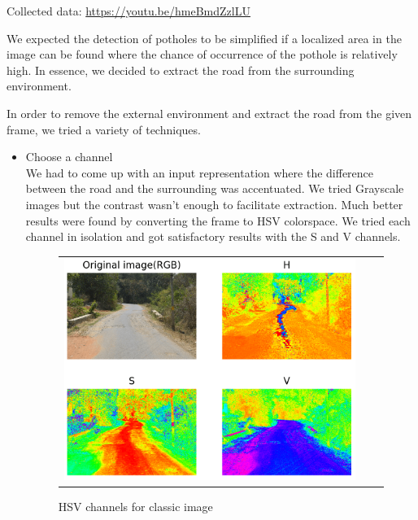 \documentclass[12pt,a4paper]{article}
\begin{document}
\vspace*{.25cm}

Collected data: \url{ https://youtu.be/hmeBmdZzlLU }

\vspace*{.25cm}

We expected the detection of potholes to be simplified if a localized area in the image can be found where the chance of occurrence of the pothole is relatively high. In essence, we decided to extract the road from the surrounding environment.

In order to remove the external environment and extract the road from the given frame, we tried a variety of techniques. 

\begin{itemize}

\item Choose a channel \\
    We had to come up with an input representation where the difference between the road and the surrounding was accentuated. We tried Grayscale images but the contrast wasn't enough to facilitate extraction. Much better results were found by converting the frame to HSV colorspace. We tried each channel in isolation and got satisfactory results with the S and V channels. 

 \begin{figure}[!ht]
\begin{center}

\begin{tabular}{ccc}
\centering
\includegraphics[width = 6in]{images/rgb_hsv_highdpi.png}
\end{tabular}
\caption{HSV channels for classic image}


\end{center}
\end{figure}
\end{itemize}
\end{document}
